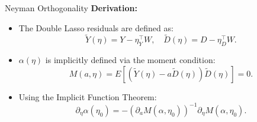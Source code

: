 \documentclass[xcolor=svgnames,t]{beamer}
\begin{document}
            
                    \begin{frame}{Neyman Orthogonality }
                        \textbf{Derivation:}
                        \begin{itemize}
                            \item The Double Lasso residuals are defined as:
                            \[
                            \tilde{Y}(\eta) = Y - \eta_Y^\top W, \quad \tilde{D}(\eta) = D - \eta_D^\top W.
                            \]
                            \pause
                            \item \(\alpha(\eta)\) is implicitly defined via the moment condition:
                            \[
                            M(a, \eta) = E\left[(\tilde{Y}(\eta) - a \tilde{D}(\eta)) \tilde{D}(\eta)\right] = 0.
                            \]
                            \pause
                            \item Using the Implicit Function Theorem:
                            \[
                            \partial_\eta \alpha(\eta_0) = -\left(\partial_a M(\alpha, \eta_0)\right)^{-1} \partial_\eta M(\alpha, \eta_0).
                            \]
                        \end{itemize}
                        \end{frame}
                        
\end{document}
